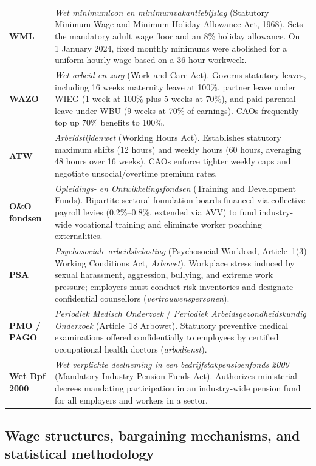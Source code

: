 \begin{table}[H]
\begin{tabular}{lp{11.2cm}}
        \textbf{WML} & \emph{Wet minimumloon en minimumvakantiebijslag} (Statutory Minimum Wage and Minimum Holiday Allowance Act, 1968). Sets the mandatory adult wage floor and an 8\% holiday allowance. On 1 January 2024, fixed monthly minimums were abolished for a uniform hourly wage based on a 36-hour workweek. \\
        \textbf{WAZO} & \emph{Wet arbeid en zorg} (Work and Care Act). Governs statutory leaves, including 16 weeks maternity leave at 100\%, partner leave under WIEG (1 week at 100\% plus 5 weeks at 70\%), and paid parental leave under WBU (9 weeks at 70\% of earnings). CAOs frequently top up 70\% benefits to 100\%. \\
        \textbf{ATW} & \emph{Arbeidstijdenwet} (Working Hours Act). Establishes statutory maximum shifts (12 hours) and weekly hours (60 hours, averaging 48 hours over 16 weeks). CAOs enforce tighter weekly caps and negotiate unsocial/overtime premium rates. \\
        \textbf{O\&O fondsen} & \emph{Opleidings- en Ontwikkelingsfondsen} (Training and Development Funds). Bipartite sectoral foundation boards financed via collective payroll levies (0.2\%--0.8\%, extended via AVV) to fund industry-wide vocational training and eliminate worker poaching externalities. \\
        \textbf{PSA} & \emph{Psychosociale arbeidsbelasting} (Psychosocial Workload, Article~1(3) Working Conditions Act, \emph{Arbowet}). Workplace stress induced by sexual harassment, aggression, bullying, and extreme work pressure; employers must conduct risk inventories and designate confidential counsellors (\emph{vertrouwenspersonen}). \\
        \textbf{PMO / PAGO} & \emph{Periodiek Medisch Onderzoek} / \emph{Periodiek Arbeidsgezondheidskundig Onderzoek} (Article~18 Arbowet). Statutory preventive medical examinations offered confidentially to employees by certified occupational health doctors (\emph{arbodienst}). \\
        \textbf{Wet Bpf 2000} & \emph{Wet verplichte deelneming in een bedrijfstakpensioenfonds 2000} (Mandatory Industry Pension Funds Act). Authorizes ministerial decrees mandating participation in an industry-wide pension fund for all employers and workers in a sector. \\
        \hline\hline
    \end{tabular}
\end{table}

\subsection*{Wage structures, bargaining mechanisms, and statistical methodology}

